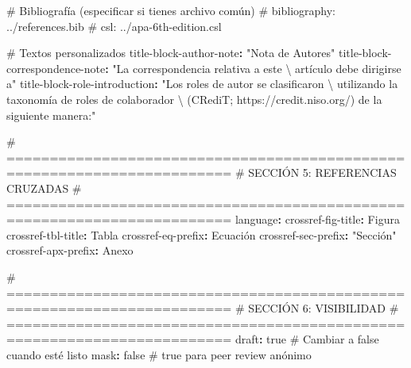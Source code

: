 \documentclass[
  doc,
  floatsintext,
  longtable,
  a4paper,
  nolmodern,
  notxfonts,
  notimes,
  12pt,
  colorlinks=true,linkcolor=blue,citecolor=blue,urlcolor=blue]{apa7}
\newenvironment{Shaded}{\begin{snugshade}}{\end{snugshade}}
\newcommand{\AttributeTok}[1]{\textcolor[rgb]{0.40,0.45,0.13}{#1}}
\newcommand{\CharTok}[1]{\textcolor[rgb]{0.13,0.47,0.30}{#1}}
\newcommand{\CommentTok}[1]{\textcolor[rgb]{0.37,0.37,0.37}{#1}}
\newcommand{\FunctionTok}[1]{\textcolor[rgb]{0.28,0.35,0.67}{#1}}
\newcommand{\KeywordTok}[1]{\textcolor[rgb]{0.00,0.23,0.31}{\textbf{#1}}}
\newcommand{\SpecialCharTok}[1]{\textcolor[rgb]{0.37,0.37,0.37}{#1}}
\newcommand{\StringTok}[1]{\textcolor[rgb]{0.13,0.47,0.30}{#1}}
\begin{document}
\begin{Shaded}
\begin{Highlighting}[]
\CommentTok{\# Bibliografía (especificar si tienes archivo común)}
\CommentTok{\# bibliography: ../references.bib}
\CommentTok{\# csl: ../apa{-}6th{-}edition.csl}

\CommentTok{\# Textos personalizados}
\FunctionTok{title{-}block{-}author{-}note}\KeywordTok{:}\AttributeTok{ }\StringTok{"Nota de Autores"}
\FunctionTok{title{-}block{-}correspondence{-}note}\KeywordTok{:}\AttributeTok{ }\StringTok{"La correspondencia relativa a este  \textbackslash{}}
\StringTok{artículo debe dirigirse a"}
\FunctionTok{title{-}block{-}role{-}introduction}\KeywordTok{:}\AttributeTok{ }\StringTok{"Los roles de autor se clasificaron    \textbackslash{}}
\StringTok{utilizando la taxonomía de roles de colaborador                       }\SpecialCharTok{\textbackslash{} }
\StringTok{(CRediT; https://credit.niso.org/) de la siguiente manera:"}

\CommentTok{\# ========================================================================}
\CommentTok{\# SECCIÓN 5: REFERENCIAS CRUZADAS}
\CommentTok{\# ========================================================================}
\FunctionTok{language}\KeywordTok{:}
\AttributeTok{  }\FunctionTok{crossref{-}fig{-}title}\KeywordTok{:}\AttributeTok{ Figura}
\AttributeTok{  }\FunctionTok{crossref{-}tbl{-}title}\KeywordTok{:}\AttributeTok{ Tabla}
\AttributeTok{  }\FunctionTok{crossref{-}eq{-}prefix}\KeywordTok{:}\AttributeTok{ Ecuación}
\AttributeTok{  }\FunctionTok{crossref{-}sec{-}prefix}\KeywordTok{:}\AttributeTok{ }\StringTok{"Sección"}
\AttributeTok{  }\FunctionTok{crossref{-}apx{-}prefix}\KeywordTok{:}\AttributeTok{ Anexo}

\CommentTok{\# ========================================================================}
\CommentTok{\# SECCIÓN 6: VISIBILIDAD}
\CommentTok{\# ========================================================================}
\FunctionTok{draft}\KeywordTok{:}\AttributeTok{ }\CharTok{true}\CommentTok{                            \# Cambiar a false cuando esté listo}
\FunctionTok{mask}\KeywordTok{:}\AttributeTok{ }\CharTok{false}\CommentTok{                            \# true para peer review anónimo}


\end{Highlighting}
\end{Shaded}
\end{document}
